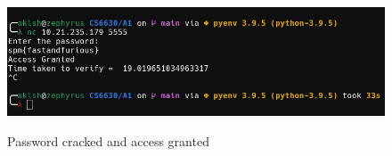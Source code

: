 \documentclass[12pt,a4paper,english]{paper}
\begin{document}
\begin{figure}[H]
    \centering
    \includegraphics[scale=0.3]{Q2_output.png}
    \label{fig:output_password}
    \caption{Password cracked and access granted}
\end{figure}





\end{document}
